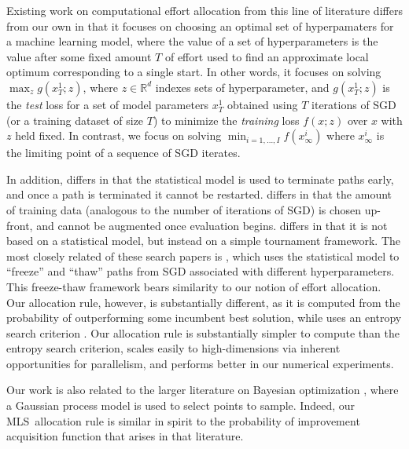 \documentclass[12pt,english]{article}
\newcommand{\pfcomment}[1]{{\color{red} PF: #1}}
\newcommand{\abbrv}{MLS}
\begin{document}
Existing work on computational effort allocation from this line of literature differs from our own in that it focuses on choosing an optimal set of hyperpamaters for a machine learning model, where the value of a set of hyperparameters is the value after some fixed amount $T$ of effort used to find an approximate local optimum corresponding to a single start.  In other words, it focuses on solving $\max_z g(x^1_T;z)$, where $z\in\mathbb{R}^d$ indexes sets of hyperparameter, and $g(x^1_T;z)$ is the {\it test} loss for a set of model parameters $x^1_T$ obtained using $T$ iterations of SGD (or a training dataset of size $T$) to minimize the {\it training} loss $f(x;z)$ over $x$ with $z$ held fixed.  In contrast, we focus on solving $\min_{i=1,\ldots,I} f(x^i_\infty)$ where $x^i_\infty$ is the limiting point of a sequence of SGD iterates. 

In addition, \cite{Hutter:2015} differs in that the statistical model is used to terminate paths early, and once a path is terminated it cannot be restarted. \cite{klein2016fast} differs in that the amount of training data (analogous to the number of iterations of SGD) is chosen up-front, and cannot be augmented once evaluation begins. \cite{li2016}  differs in that it is not based on a statistical model, but instead on a simple tournament framework.
The most closely related of these search papers is \cite{Swersky:2014}, which uses the statistical model to ``freeze'' and ``thaw'' paths from SGD associated with different hyperparameters.  This freeze-thaw framework bears similarity to our notion of effort allocation.  Our allocation rule, however, is substantially different, as it is computed from the probability of outperforming some incumbent best solution, while \cite{Swersky:2014} uses an entropy search criterion \citep{entropySearch}.  Our allocation rule is substantially simpler to compute than the entropy search criterion, scales easily to high-dimensions via inherent opportunities for parallelism, and performs better in our numerical experiments.

Our work is also related to the larger literature on Bayesian optimization \citep{jones1998efficient,forrester2008engineering,brochu2010tutorial,frazier2009knowledge}, where a Gaussian process model is used to select points to sample.  Indeed, our \abbrv\ allocation rule is similar in spirit to the probability of improvement acquisition function \citep{brochu2010tutorial}  that arises in that literature. 
\end{document}
